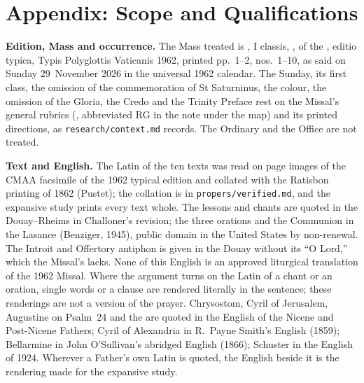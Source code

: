 
\section{Appendix: Scope and Qualifications}

{\footnotesize
\textbf{Edition, Mass and occurrence.} The Mass treated is , I classis, , of the
, editio typica, Typis Polyglottis Vaticanis 1962,
printed pp.~1--2, nos.~1--10, as said on Sunday 29~November 2026 in the
universal 1962 calendar. The Sunday, its first class, the omission of the
commemoration of St Saturninus, the colour, the omission of the Gloria, the
Credo and the Trinity Preface rest on the Missal's general rubrics
(, abbreviated RG in the note under the map)
and its printed directions, as \texttt{research/context.md} records. The Ordinary and
the Office are not treated.

\textbf{Text and English.} The Latin of the ten texts was read on page images
of the CMAA facsimile of the 1962 typical edition and collated with the
Ratisbon printing of 1862 (Pustet); the collation is in
\texttt{propers/verified.md}, and the expansive study prints every text whole.
The lessons and chants are quoted in the Douay--Rheims in Challoner's
revision; the three orations and the Communion in the Lasance  (Benziger, 1945), public domain in the United States by non-renewal.
The Introit and Offertory antiphon is given in the Douay without its ``O
Lord,'' which the Missal's  lacks. None of this English is an approved liturgical translation of the 1962
Missal. Where the argument turns on the Latin of a chant or an oration, single
words or a clause are rendered literally in the sentence; these renderings are
not a version of the prayer. Chrysostom, Cyril of Jerusalem, Augustine on
Psalm~24 and the  are quoted in the English of the Nicene
and Post-Nicene Fathers; Cyril of Alexandria in R.~Payne Smith's English
(1859); Bellarmine in John O'Sullivan's abridged English (1866); Schuster in
the English of 1924. Wherever a Father's own Latin is quoted, the English
beside it is the rendering made for the expansive study.

}
